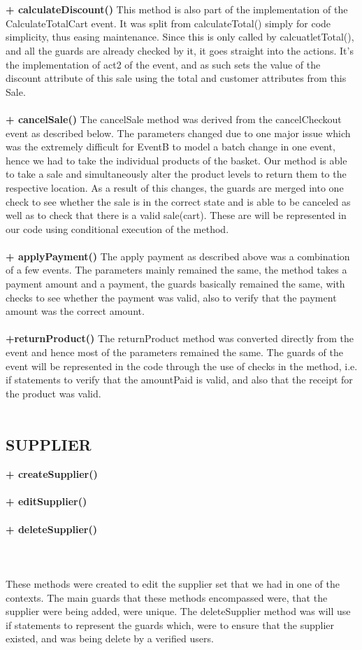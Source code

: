 \documentclass[a4paper]{article}
\begin{document}
\\\\
{\bf + calculateDiscount()}
This method is also part of the implementation of the CalculateTotalCart event. It was split from calculateTotal() simply for code simplicity, thus easing maintenance. Since this is only called by calcuatletTotal(), and all the guards are already checked by it, it goes straight into the actions. It’s the implementation of act2 of the event, and as such sets the value of the discount attribute of this sale using the total and customer attributes from this Sale.
\\\\
{\bf + cancelSale()}
The cancelSale method was derived from the cancelCheckout event as described below. The parameters changed due to one major issue which was the extremely difficult for EventB to model a batch change in one event, hence we had to take the individual products of the basket. Our method is able to take a sale and simultaneously alter the product levels to return them to the respective location. As a result of this changes, the guards are merged into one check to see whether the sale is in the correct state and is able to be canceled as well as to check that there is a valid sale(cart). These are will be represented in our code using conditional execution of the method. 
\\\\
{\bf + applyPayment()}
The apply payment as described above was a combination of a few events. The parameters mainly remained the same, the method takes a payment amount and a payment, the guards basically remained the same, with checks to see whether the  payment was valid, also to verify that the payment amount was the correct amount. 
\\\\
{\bf +returnProduct()}
The returnProduct method was converted directly from the event and hence most of the parameters remained the same. The guards of the  event will be represented in the code through the use of checks in the method, i.e. if statements to verify that the amountPaid is valid, and also that the receipt for the product was valid.
\\\\
\subsection{SUPPLIER}
{\bf + createSupplier()}\\\\
{\bf + editSupplier()}\\\\
{\bf + deleteSupplier()}\\\\
\\\\
These methods were created to edit the supplier set that we had in one of the contexts. The main guards that these methods encompassed were, that the supplier were being added, were unique. The deleteSupplier method was will use if statements to represent the guards which, were to ensure that the supplier existed, and was being delete by a verified users. 
\\\\
\end{document}
